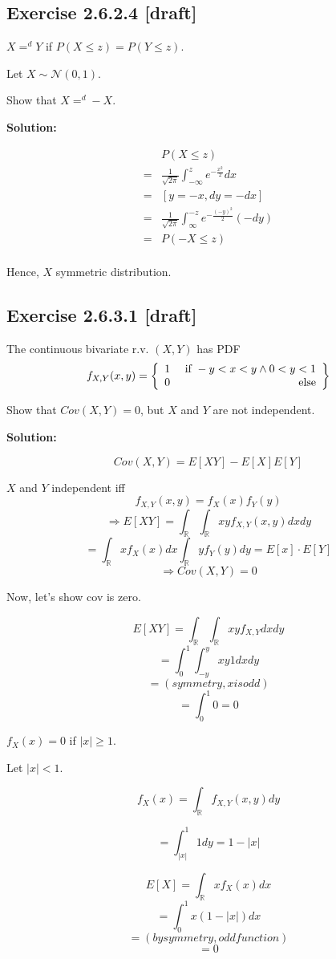 \documentclass{article}
\begin{document}
\subsection{Exercise 2.6.2.4 [draft]}

\(X=^dY\) if \(P(X\leq z)=P(Y\leq z)\).

Let \(X \sim \mathcal{N}(0, 1)\).

Show that \(X=^d-X\).

\textbf{Solution:}

\begin{align*}
	 & P(X\leq z) \\
	=& \frac{1}{\sqrt{2\pi}} \int_{-\infty}^z e^{-\frac{x^2}{2}}dx \\
	=& [y=-x, dy=-dx] \\
	=& \frac{1}{\sqrt{2\pi}} \int_{\infty}^{-z} e^{-\frac{(-y)^2}{2}}(-dy) \\
	=& P(-X\leq z) \\
\end{align*}

Hence, \(X\) symmetric distribution.

\subsection{Exercise 2.6.3.1 [draft]}

The continuous bivariate r.v. \((X,Y)\) has PDF
\[f_{X,Y}(x,y)=\left\{\begin{array}{lr}1 & \text{ if }-y<x<y \wedge 0<y<1\\0 & \text{ else}\end{array}\right\}\]

Show that \(Cov(X,Y)=0\), but \(X\) and \(Y\) are not independent.

\textbf{Solution:}

\[Cov(X,Y) = E[XY]-E[X]E[Y]\]

\(X\) and \(Y\) independent iff
\[f_{X,Y}(x,y)=f_X(x)f_Y(y)\]
\[\Rightarrow E[XY]=\int_\mathbb{R}\int_\mathbb{R} xy f_{X,Y}(x,y)dxdy\]
\[= \int_\mathbb{R}xf_X(x)dx \int_\mathbb{R} yf_Y(y)dy = E[x]\cdot E[Y]\]
\[\Rightarrow Cov(X,Y)=0\]

Now, let's show cov is zero.

\[E[XY]=\int_\mathbb{R} \int_\mathbb{R} xy f_{X,Y}dxdy\]
\[=\int_0^1\int_{-y}^y xy1dxdy\]
\[=(symmetry, x is odd)\]
\[=\int_0^1 0=0\]

\(f_X(x)=0\) if \(|x|\geq 1\).

Let \(|x|<1\).

\[f_X(x)=\int_\mathbb{R} f_{X,Y}(x,y)dy\]

\[=\int_{|x|}^1 1dy = 1-|x|\]

\[E[X] = \int_\mathbb{R} x f_X(x)dx\]
\[= \int_0^1 x (1-|x|)dx\]
\[= (by symmetry, odd function)\]
\[= 0\]
\end{document}
